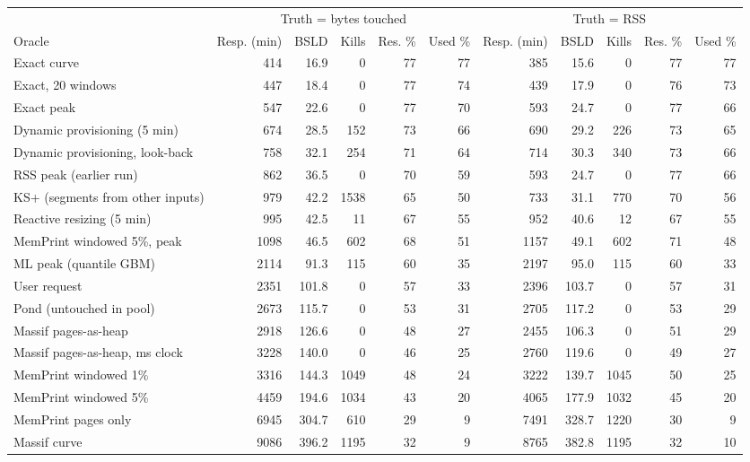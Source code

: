 \begin{tabular}{lrrrrrrrrrr}
\toprule
 & \multicolumn{5}{c}{Truth = bytes touched} & \multicolumn{5}{c}{Truth = RSS} \\
\cmidrule(lr){2-6} \cmidrule(lr){7-11}
Oracle & Resp. (min) & BSLD & Kills & Res. \% & Used \% & Resp. (min) & BSLD & Kills & Res. \% & Used \% \\
\midrule
Exact curve & 414 & 16.9 & 0 & 77 & 77 & 385 & 15.6 & 0 & 77 & 77 \\
Exact, 20 windows & 447 & 18.4 & 0 & 77 & 74 & 439 & 17.9 & 0 & 76 & 73 \\
Exact peak & 547 & 22.6 & 0 & 77 & 70 & 593 & 24.7 & 0 & 77 & 66 \\
Dynamic provisioning (5 min) & 674 & 28.5 & 152 & 73 & 66 & 690 & 29.2 & 226 & 73 & 65 \\
Dynamic provisioning, look-back & 758 & 32.1 & 254 & 71 & 64 & 714 & 30.3 & 340 & 73 & 66 \\
RSS peak (earlier run) & 862 & 36.5 & 0 & 70 & 59 & 593 & 24.7 & 0 & 77 & 66 \\
KS+ (segments from other inputs) & 979 & 42.2 & 1538 & 65 & 50 & 733 & 31.1 & 770 & 70 & 56 \\
Reactive resizing (5 min) & 995 & 42.5 & 11 & 67 & 55 & 952 & 40.6 & 12 & 67 & 55 \\
MemPrint windowed 5\%, peak & 1098 & 46.5 & 602 & 68 & 51 & 1157 & 49.1 & 602 & 71 & 48 \\
ML peak (quantile GBM) & 2114 & 91.3 & 115 & 60 & 35 & 2197 & 95.0 & 115 & 60 & 33 \\
User request & 2351 & 101.8 & 0 & 57 & 33 & 2396 & 103.7 & 0 & 57 & 31 \\
Pond (untouched in pool) & 2673 & 115.7 & 0 & 53 & 31 & 2705 & 117.2 & 0 & 53 & 29 \\
Massif pages-as-heap & 2918 & 126.6 & 0 & 48 & 27 & 2455 & 106.3 & 0 & 51 & 29 \\
Massif pages-as-heap, ms clock & 3228 & 140.0 & 0 & 46 & 25 & 2760 & 119.6 & 0 & 49 & 27 \\
MemPrint windowed 1\% & 3316 & 144.3 & 1049 & 48 & 24 & 3222 & 139.7 & 1045 & 50 & 25 \\
MemPrint windowed 5\% & 4459 & 194.6 & 1034 & 43 & 20 & 4065 & 177.9 & 1032 & 45 & 20 \\
MemPrint pages only & 6945 & 304.7 & 610 & 29 & 9 & 7491 & 328.7 & 1220 & 30 & 9 \\
Massif curve & 9086 & 396.2 & 1195 & 32 & 9 & 8765 & 382.8 & 1195 & 32 & 10 \\

\end{tabular}

